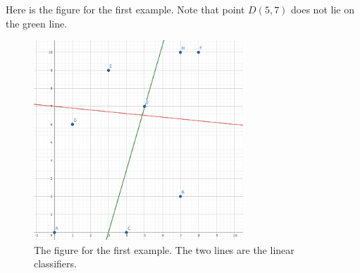 Here is the figure for the first example. Note that point $D(5,7)$ does not lie on the green line.
\begin{figure}[h]
\center
\includegraphics[width=0.7\textwidth]{image/l.png}
\caption{The figure for the first example. The two lines are the linear classifiers.}
\end{figure}